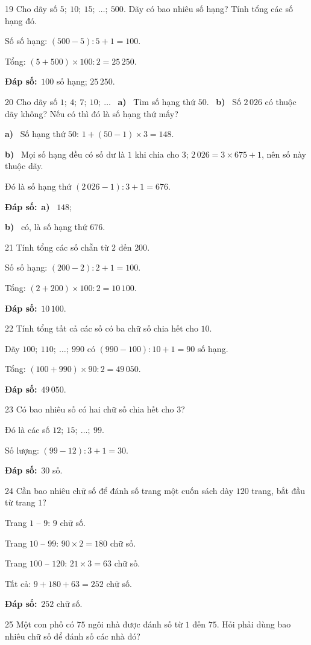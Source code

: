 \documentclass[11pt]{article}
\newif\ifsol \solfalse
\providecommand{\AnsWord}{Đáp số}
\newcommand{\dapso}[1]{\par\textbf{\AnsWord:}\ #1}
\newcommand{\probsol}[1]{%
  \begin{lrbox}{\solmeasure}\begin{minipage}{\dimexpr\linewidth-24pt\relax}#1\end{minipage}\end{lrbox}%
  \ifsol
    \begin{solbox}#1\end{solbox}%
  \else
    \setlength{\solht}{\dimexpr\ht\solmeasure+\dp\solmeasure+0.85cm\relax}%
    \ifdim\solht<1.35cm\setlength{\solht}{1.35cm}\fi
    \begin{tcolorbox}[colback=white,colframe=Line,boxrule=0.8pt,arc=5pt,
      left=8pt,right=8pt,top=4pt,bottom=4pt,height=\solht]{\footnotesize\color{Slate}\itshape\WorkWord}\end{tcolorbox}%
  \fi}
\newcommand{\pa}[1]{\textbf{#1)}\ }
\newcommand{\gap}{\vspace{0.3cm}}
\def\WorkWord{Bài làm:}
\def\AnsWord{Đáp số}
\begin{document}
\gap
\begin{probbox}{19}{\relax}
Cho dãy số $5;\ 10;\ 15;\ \dots;\ 500$. Dãy có bao nhiêu số hạng? Tính tổng các số hạng đó.
\end{probbox}
\probsol{
Số số hạng: $(500-5):5+1=100$.\par Tổng: $(5+500)\times100:2=25\,250$.
\dapso{$100$ số hạng; $25\,250$.}}
\gap
\begin{probbox}{20}{\relax}
Cho dãy số $1;\ 4;\ 7;\ 10;\ \dots$ \ \pa{a} Tìm số hạng thứ $50$. \ \pa{b} Số $2\,026$ có thuộc dãy không? Nếu có thì đó là số hạng thứ mấy?
\end{probbox}
\probsol{
\pa{a} Số hạng thứ $50$: $1+(50-1)\times3=148$.\par
\pa{b} Mọi số hạng đều có số dư là $1$ khi chia cho $3$; $2\,026=3\times675+1$, nên số này thuộc dãy.\par Đó là số hạng thứ $(2\,026-1):3+1=676$.
\dapso{\pa{a} $148$;\par \pa{b} có, là số hạng thứ $676$.}}
\gap
\begin{probbox}{21}{\relax}
Tính tổng các số chẵn từ $2$ đến $200$.
\end{probbox}
\probsol{
Số số hạng: $(200-2):2+1=100$.\par Tổng: $(2+200)\times100:2=10\,100$.
\dapso{$10\,100$.}}
\gap
\begin{probbox}{22}{\relax}
Tính tổng tất cả các số có ba chữ số chia hết cho $10$.
\end{probbox}
\probsol{
Dãy $100;\ 110;\ \dots;\ 990$ có $(990-100):10+1=90$ số hạng.\par Tổng: $(100+990)\times90:2=49\,050$.
\dapso{$49\,050$.}}
\gap
\begin{probbox}{23}{\relax}
Có bao nhiêu số có hai chữ số chia hết cho $3$?
\end{probbox}
\probsol{
Đó là các số $12;\ 15;\ \dots;\ 99$.\par Số lượng: $(99-12):3+1=30$.
\dapso{$30$ số.}}
\gap
\begin{probbox}{24}{\relax}
Cần bao nhiêu chữ số để đánh số trang một cuốn sách dày $120$ trang, bắt đầu từ trang $1$?
\end{probbox}
\probsol{
Trang $1$ -- $9$: $9$ chữ số.\par Trang $10$ -- $99$: $90\times2=180$ chữ số.\par Trang $100$ -- $120$: $21\times3=63$ chữ số.\par Tất cả: $9+180+63=252$ chữ số.
\dapso{$252$ chữ số.}}
\gap
\begin{probbox}{25}{\relax}
Một con phố có $75$ ngôi nhà được đánh số từ $1$ đến $75$. Hỏi phải dùng bao nhiêu chữ số để đánh số các nhà đó?
\end{probbox}
\end{document}

